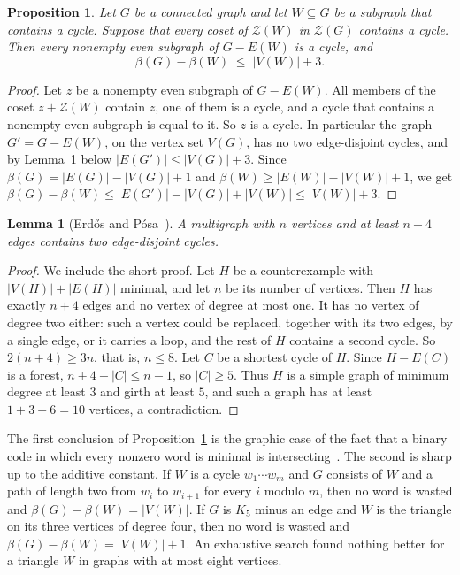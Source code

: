 \documentclass[11pt]{article}
\newtheorem{lemma}[theorem]{Lemma}
\newtheorem{proposition}[theorem]{Proposition}
\theoremstyle{definition}
\theoremstyle{remark}
\newcommand{\Z}{\mathcal{Z}}
\begin{document}
\begin{proposition}\label{prop:nowaste}
Let $G$ be a connected graph and let $W\subseteq G$ be a subgraph that contains a cycle. Suppose
that every coset of $\Z(W)$ in $\Z(G)$ contains a cycle. Then every nonempty even subgraph of
$G-E(W)$ is a cycle, and
\[
  \beta(G)-\beta(W)\;\le\;|V(W)|+3 .
\]
\end{proposition}

\begin{proof}
Let $z$ be a nonempty even subgraph of $G-E(W)$. All members of the coset $z+\Z(W)$ contain $z$, one
of them is a cycle, and a cycle that contains a nonempty even subgraph is equal to it. So $z$ is a
cycle. In particular the graph $G'=G-E(W)$, on the vertex set $V(G)$, has no two edge-disjoint
cycles, and by Lemma~\ref{lem:EP} below $|E(G')|\le|V(G)|+3$. Since $\beta(G)=|E(G)|-|V(G)|+1$ and
$\beta(W)\ge|E(W)|-|V(W)|+1$, we get $\beta(G)-\beta(W)\le|E(G')|-|V(G)|+|V(W)|\le|V(W)|+3$.
\end{proof}

\begin{lemma}[Erd\H{o}s and P\'osa~\cite{EP}]\label{lem:EP}
A multigraph with $n$ vertices and at least $n+4$ edges contains two edge-disjoint cycles.
\end{lemma}

\begin{proof}
We include the short proof. Let $H$ be a counterexample with $|V(H)|+|E(H)|$ minimal, and let $n$
be its number of vertices. Then $H$ has exactly $n+4$ edges and no vertex of degree at most one. It
has no vertex of degree two either: such a vertex could be replaced, together with its two edges, by
a single edge, or it carries a loop, and the rest of $H$ contains a second cycle. So
$2(n+4)\ge3n$, that is, $n\le8$. Let $C$ be a shortest cycle of $H$. Since $H-E(C)$ is a forest,
$n+4-|C|\le n-1$, so $|C|\ge5$. Thus $H$ is a simple graph of minimum degree at least $3$ and girth
at least $5$, and such a graph has at least $1+3+6=10$ vertices, a contradiction.
\end{proof}

The first conclusion of Proposition~\ref{prop:nowaste} is the graphic case of the fact that a binary
code in which every nonzero word is minimal is intersecting~\cite[\S2]{AACST}. The second is sharp up
to the additive constant. If $W$ is a cycle $w_1\cdots w_m$ and $G$ consists of $W$ and a path of
length two from $w_i$ to $w_{i+1}$ for every $i$ modulo $m$, then no word is wasted and
$\beta(G)-\beta(W)=|V(W)|$. If $G$ is $K_5$ minus an edge and $W$ is the triangle on its three
vertices of degree four, then no word is wasted and $\beta(G)-\beta(W)=|V(W)|+1$. An exhaustive
search found nothing better for a triangle $W$ in graphs with at most eight vertices.
\end{document}
